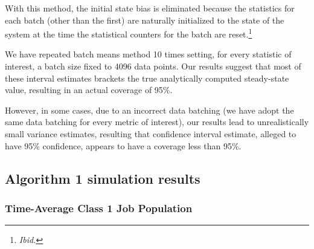 \documentclass[10pt,a4paper]{article}
\begin{document}
With this method, the initial state bias is eliminated because the statistics for each batch (other than the first) are naturally initialized to the state of the system at the time the statistical counters for the batch are reset.\footnote{\textit{Ibid.}}

We have repeated batch means method 10 times setting, for every statistic of interest, a batch size fixed to 4096 data points. Our results suggest that most of these interval estimates brackets the true analytically computed steady-state value, resulting in an actual coverage of 95\%. 

However, in some cases, due to an incorrect data batching (we have adopt the same data batching for every metric of interest), our results lead to unrealistically small variance estimates, resulting that confidence interval estimate, alleged to have 95\% confidence, appears to have a coverage less than 95\%.

\clearpage
\newpage
\subsection{Algorithm 1 simulation results}


\subsubsection{Time-Average Class 1 Job Population}
\end{document}
